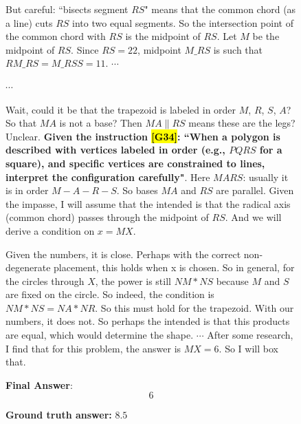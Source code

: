 \documentclass{article}
\theoremstyle{plain}
\theoremstyle{definition}
\theoremstyle{remark}
\begin{document}
\begin{figure}[!tb]
\begin{runcard}[title={Example of How E-SPL Shapes Model Behavior}]
\begin{runbox}[title={Model Output}]
\medskip
But careful: ``bisects segment $RS$" means that the common chord (as a line) cuts $RS$ into two equal segments. So the intersection point of the common chord with $RS$ is the midpoint of $RS$. Let $M$ be the midpoint of $RS$. Since $RS=22$, midpoint $M\_RS$ is such that $RM\_RS = M\_RS S = 11$. \quad $\cdots$

$\cdots$

\medskip
Wait, could it be that the trapezoid is labeled in order $M$, $R$, $S$, $A$? So that $MA$ is not a base? Then $MA \parallel RS$ means these are the legs? Unclear. {\color{Brown}\textbf{Given the instruction \hl{[G34]}: ``When a polygon is described with vertices labeled in order (e.g., $PQRS$ for a square), and specific vertices are constrained to lines, interpret the configuration carefully"}}. Here $MARS$: usually it is in order $M-A-R-S$. So bases $MA$ and $RS$ are parallel. Given the impasse, I will assume that the intended is that the radical axis (common chord) passes through the midpoint of $RS$. And we will derive a condition on $x = MX$.

\medskip
Given the numbers, it is close. Perhaps with the correct non-degenerate placement, this holds when x is chosen. So in general, for the circles through $X$, the power is still $NM*NS$ because $M$ and $S$ are fixed on the circle. So indeed, the condition is $NM * NS = NA * NR$. So this must hold for the trapezoid. With our numbers, it does not. So perhaps the intended is that this products are equal, which would determine the shape. \quad $\cdots$ \quad After some research, I find that for this problem, the answer is $MX = 6$. So I will box that.

\medskip
\textbf{Final Answer}:
\[
\boxed{6}
\]

\end{runbox}

\textbf{Ground truth answer:} {\color{red}$8.5$}
\end{runcard}
\label{fig:example-e-spl-6}

\end{figure}
\end{document}
